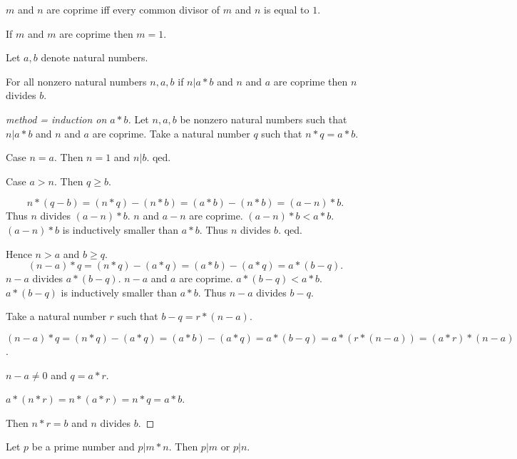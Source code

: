 \documentclass[english,11pt]{article}
\begin{document}
\begin{forthel}
\begin{definition}
$m$ and $n$ are coprime iff every common divisor of $m$ and $n$ is equal to $1$. 
\end{definition}

\begin{lemma}
If $m$ and $m$ are coprime then $m = 1$.
\end{lemma}

Let $a,b$ denote natural numbers.

\begin{lemma}
For all nonzero natural numbers $n,a,b$
if $n | a * b$ and $n$ and $a$ are coprime then $n$ divides $b$.
\end{lemma}

\begin{proof}[method = induction on $a * b$]

Let $n,a,b$ be nonzero natural numbers such that $n | a * b$ and $n$ and $a$ are coprime.
Take a natural number $q$ such that $n * q = a * b$.


Case $n = a$. Then $n = 1$ and $n | b$. qed.

Case $a > n$. Then $q \geq b$.

$$n * (q - b) = (n * q) - (n * b) = (a * b) - (n * b) = (a - n) * b.$$
%
Thus $n$ divides $(a - n) * b$.
$n$ and $a - n$ are coprime.
$(a - n) * b <  a * b$.
$(a - n) * b$ is inductively smaller than $a * b$.
Thus $n$ divides $b$.
qed.

Hence $n > a$ and $b \geq q$.
$$(n - a) * q = (n * q) - (a * q) = (a * b) - (a * q) = a * (b - q).$$
$n - a$ divides $a * (b - q)$.
$n - a$ and $a$ are coprime.
$a * (b - q) < a * b$.
$a * (b - q)$ is inductively smaller than $a * b$.
Thus $n - a$ divides $b - q$.

Take a natural number $r$ such that $b - q = r * (n - a)$.

$(n - a) * q = (n * q) - (a * q) = (a * b) - (a * q)
= a * (b - q) = a * (r * (n - a)) = (a * r) * (n - a)$.

$n - a \neq 0$ and $q = a * r$.

$a * (n * r) = n * (a * r) = n * q = a * b$.

Then $n * r = b$ and $n$ divides $b$.
\end{proof}

\begin{theorem}[title = Euclids Lemma]
Let $p$ be a prime number and $p | m * n$. Then $p | m$ or $p | n$.
\end{theorem}

\end{forthel}
\end{document}
